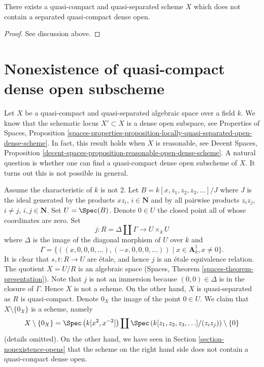 \begin{lemma}
\label{lemma-no-dense-separated-quasi-compact-open-in-qcqs}
There exists a quasi-compact and quasi-separated scheme $X$ which does
not contain a separated quasi-compact dense open.
\end{lemma}

\begin{proof}
See discussion above.
\end{proof}







\section{Nonexistence of quasi-compact dense open subscheme}
\label{section-nonexistence-qc-dense-open-subscheme}

\noindent
Let $X$ be a quasi-compact and quasi-separated algebraic space over a field
$k$. We know that the schematic locus $X' \subset X$ is a dense open
subspace, see
Properties of Spaces, Proposition
\ref{spaces-properties-proposition-locally-quasi-separated-open-dense-scheme}.
In fact, this result holds when $X$ is reasonable, see
Decent Spaces, Proposition
\ref{decent-spaces-proposition-reasonable-open-dense-scheme}.
A natural question is whether one can find a quasi-compact dense
open subscheme of $X$. It turns out this is not possible in general.

\medskip\noindent
Assume the characteristic of $k$ is not 2.
Let $B = k[x, z_1, z_2, z_3, \ldots]/J$ where $J$ is the ideal generated by
the products $xz_i$, $i \in \mathbf{N}$ and by all pairwise products
$z_iz_j$, $i \not = j$, $i, j \in \mathbf{N}$. Set $U = \Spec(B)$.
Denote $0 \in U$ the closed point all of whose coordinates are zero.
Set
$$
j : R = \Delta \coprod \Gamma \longrightarrow U \times_k U
$$
where $\Delta$ is the image of the diagonal morphism of $U$ over $k$ and
$$
\Gamma = \{((x, 0, 0, 0, \ldots), (-x, 0, 0, 0, \ldots))
\mid x \in \mathbf{A}^1_k, x \not = 0\}.
$$
It is clear that $s, t : R \to U$ are \'etale, and hence
$j$ is an \'etale equivalence relation. The quotient $X = U/R$
is an algebraic space (Spaces, Theorem \ref{spaces-theorem-presentation}).
Note that $j$ is not an immersion because
$(0, 0) \in \Delta$ is in the closure of $\Gamma$.
Hence $X$ is not a scheme. On the other hand, $X$ is quasi-separated
as $R$ is quasi-compact. Denote $0_X$ the image of the point $0 \in U$.
We claim that $X \setminus \{0_X\}$ is a scheme, namely
$$
X \setminus \{0_X\} =
\Spec\left(k[x^2, x^{-2}]\right) \coprod
\Spec\left(k[z_1, z_2, z_3, \ldots]/(z_iz_j)\right) \setminus \{0\}
$$
(details omitted). On the other hand, we have seen in
Section \ref{section-nonexistence-opens} that the scheme
on the right hand side does not contain
a quasi-compact dense open.

